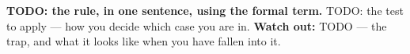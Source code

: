 \documentclass[12pt]{article}
\begin{document}
\vspace{0.14in}

\begin{remindbox}
\small \textbf{TODO: the rule, in one sentence, using the formal term.} TODO: the test to apply
--- how you decide which case you are in. \textbf{Watch out:} TODO --- the trap, and what it
looks like when you have fallen into it.
\end{remindbox}
\end{document}

